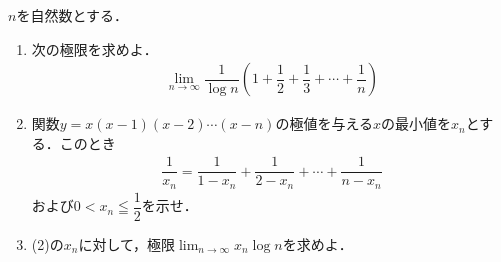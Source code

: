 \documentclass[../../main.tex]{subfiles}
\begin{document}
$n$を自然数とする．
\begin{enumerate}
  \item 次の極限を求めよ．
    \begin{align}
      \lim_{n \to \infty}\dfrac{1}{\log n} \left( 1+\dfrac{1}{2}+\dfrac{1}{3}+\cdots+\dfrac{1}{n} \right)
    \end{align}
  \item 関数$y=x(x-1)(x-2)\cdots(x-n)$の極値を与える$x$の最小値を$x_n$とする．このとき
    \begin{align}
      \dfrac{1}{x_n}=\dfrac{1}{1-x_n}+\dfrac{1}{2-x_n}+\cdots+\dfrac{1}{n-x_n}
    \end{align}
    および$\displaystyle 0 < x_n \leqq \dfrac{1}{2}$を示せ．
  \item (2)の$x_n$に対して，極限$\displaystyle\lim_{n \to \infty}x_n\log n$を求めよ．
\end{enumerate}
\end{document}
